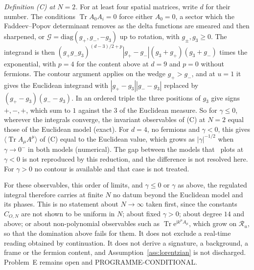 \emph{Definition (C) at \(N=2\).} For at least four spatial matrices, write \(d\) for their number. The conditions \(\operatorname{Tr}A_0A_i=0\) force either \(A_0=0\), a sector which the Faddeev--Popov determinant removes as the delta functions are smeared and then sharpened, or \(\mathcal G=\mathrm{diag}(g_+,g_-,-g_3)\) up to rotation, with \(g_\pm,g_3\ge0\). The integrand is then \((g_+g_-g_3)^{(d-3)/2+p}|g_+-g_-|(g_3+g_+)(g_3+g_-)\) times the exponential, with \(p=4\) for the content above at \(d=9\) and \(p=0\) without fermions. The contour argument applies on the wedge \(g_+>g_-\), and at \(u=1\) it gives the Euclidean integrand with \(|g_+-g_3||g_--g_3|\) replaced by \((g_+-g_3)(g_--g_3)\). In an ordered triple the three positions of \(g_3\) give signs \(+,-,+\), which sum to \(1\) against the \(3\) of the Euclidean measure. So for \(\gamma\le0\), wherever the integrals converge, the invariant observables of (C) at \(N=2\) equal those of the Euclidean model (exact). For \(d=4\), no fermions and \(\gamma<0\), this gives \(\langle\operatorname{Tr}A_\mu A^\mu\rangle\) of (C) equal to the Euclidean value, which grows as \(|\gamma|^{-1/2}\) when \(\gamma\to0^-\) in both models (numerical). The gap between the models that~\cite{ChouNishimuraTripathi2025} plots at \(\gamma<0\) is not reproduced by this reduction, and the difference is not resolved here. For \(\gamma>0\) no contour is available and that case is not treated.

For these observables, this order of limits, and \(\gamma\le0\) or \(\gamma\) as above, the regulated integral therefore carries at finite \(N\) no datum beyond the Euclidean model and its phases. This is no statement about \(N\to\infty\) taken first, since the constants \(C_{O,N}\) are not shown to be uniform in \(N\); about fixed \(\gamma>0\); about degree \(14\) and above; or about non-polynomial observables such as \(\operatorname{Tr}\mathrm e^{\mathrm ik^\mu A_\mu}\), which grow on \(\mathcal R_u\), so that the domination above fails for them. It does not exclude a real-time reading obtained by continuation. It does not derive a signature, a background, a frame or the fermion content, and Assumption~\ref{ass:lorentzian} is not discharged. Problem~E remains open and PROGRAMME-CONDITIONAL.

